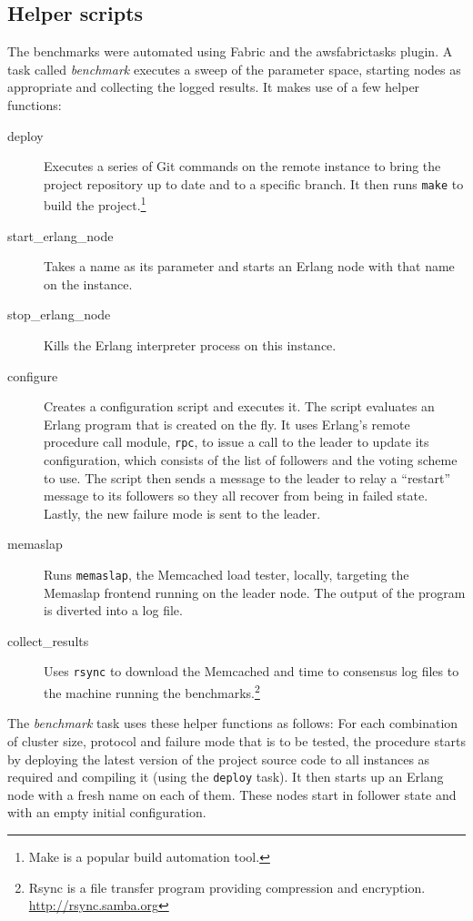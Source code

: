 \documentclass[11pt,chapterprefix=true,toc=bibliography,numbers=noendperiod,
               footnotes=multiple,twoside]{scrreprt}
\begin{document}
\subsection{Helper scripts\label{ssc:benchmarking-scripts}}

The benchmarks were automated using Fabric and the awsfabrictasks plugin. A task called \textit{benchmark} executes a sweep of the parameter space, starting nodes as appropriate and collecting the logged results. It makes use of a few helper functions:

\begin{description}
    \item[deploy] Executes a series of Git commands on the remote instance to bring the project repository up to date and to a specific branch. It then runs \texttt{make} to build the project.\footnote{Make is a popular build automation tool.}
    \item[start\_erlang\_node] Takes a name as its parameter and starts an Erlang node with that name on the instance.
    \item[stop\_erlang\_node] Kills the Erlang interpreter process on this instance.
    \item[configure] Creates a configuration script and executes it. The script evaluates an Erlang program that is created on the fly. It uses Erlang's remote procedure call module, \texttt{rpc}, to issue a call to the leader to update its configuration, which consists of the list of followers and the voting scheme to use. The script then sends a message to the leader to relay a \enquote{restart} message to its followers so they all recover from being in failed state. Lastly, the new failure mode is sent to the leader.
    \item[memaslap] Runs \texttt{memaslap}, the Memcached load tester, locally, targeting the Memaslap frontend running on the leader node. The output of the program is diverted into a log file.
    \item[collect\_results] Uses \texttt{rsync} to download the Memcached and time to consensus log files to the machine running the benchmarks.\footnote{Rsync is a file transfer program providing compression and encryption. \url{http://rsync.samba.org}}
\end{description}

The \textit{benchmark} task uses these helper functions as follows: For each combination of cluster size, protocol and failure mode that is to be tested, the procedure starts by deploying the latest version of the project source code to all instances as required and compiling it (using the \texttt{deploy} task). It then starts up an Erlang node with a fresh name on each of them. These nodes start in follower state and with an empty initial configuration.
\end{document}
